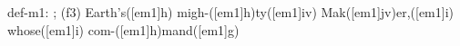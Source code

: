def-m1: \grealign;
(f3) Earth's([em1]h) migh-([em1]h)ty([em1]iv) Mak([em1]jv)er,([em1]i) whose([em1]i) com-([em1]h)mand([em1]g)